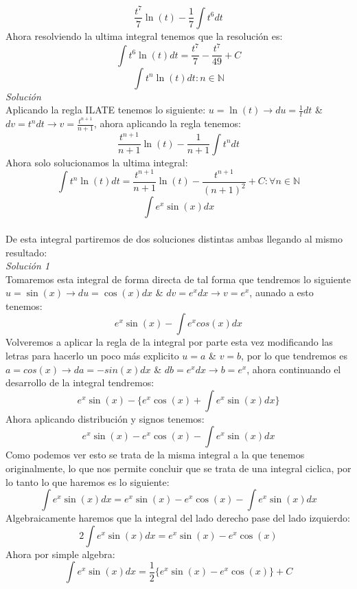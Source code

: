 \documentclass[10pt,executivepaper]{article}
\begin{document}
\[\frac{t^7}{7}\ln(t)-\frac{1}{7}\int t^{6}dt\]
Ahora resolviendo la ultima integral tenemos que la resolución es:\\
\[\int t^{6}\ln(t)dt = \frac{t^{7}}{7}-\frac{t^{7}}{49} + C\]
\vspace{1cm}
\[\int t^{n}\ln(t)dt \colon n \in \mathbb{N}\]
\textit{Solución}\\
Aplicando la regla ILATE tenemos lo siguiente: $u=\ln(t)\rightarrow du=\frac{1}{t}dt$ \& $dv=t^{n}dt \rightarrow v=\frac{t^{n+1}}{n+1}$, ahora aplicando la regla tenemos:\\
\[\frac{t^{n+1}}{n+1}\ln(t)-\frac{1}{n+1}\int t^{n}dt\]
Ahora solo solucionamos la ultima integral:
\[\int t^{n}\ln(t)dt = \frac{t^{n+1}}{n+1}\ln(t)-\frac{t^{n+1}}{(n+1)^{2}} + C \colon \forall n \in \mathbb{N}\]
\vspace{1cm}
\[\int e^{x}\sin(x)dx\]\\
De esta integral partiremos de dos soluciones distintas ambas llegando al mismo resultado:\\
\textit{Solución 1}\\
Tomaremos esta integral de forma directa de tal forma que tendremos lo siguiente $u=\sin(x)\rightarrow du= \cos(x)dx$ \& $dv=e^{x}dx \rightarrow v=e^{x}$, aunado a esto tenemos:
\[e^{x}\sin(x) - \int e^{x}cos(x)dx \]
Volveremos a aplicar la regla de la integral por parte esta vez modificando las letras para hacerlo un poco más explicito $u=a$ \& $v=b$, por lo que tendremos es $a=cos(x) \rightarrow da=-sin(x)dx$ \& $db=e^{x}dx \rightarrow b=e^{x}$, ahora continuando el desarrollo de la integral tendremos:
\[e^{x}\sin(x)-\{e^{x}\cos(x)+\int e^{x}\sin(x)dx\}\]
Ahora aplicando distribución y signos tenemos:
\[e^{x}\sin(x)-e^{x}\cos(x)-\int e^{x}\sin(x)dx\]
Como podemos ver esto se trata de la misma integral a la que tenemos originalmente, lo que nos permite concluir que se trata de una integral ciclica, por lo tanto lo que haremos es lo siguiente:
\[\int e^{x}\sin(x)dx = e^{x}\sin(x)-e^{x}\cos(x)-\int e^{x}\sin(x)dx\]
Algebraicamente haremos que la integral del lado derecho pase del lado izquierdo:
\[2\int e^{x}\sin(x)dx = e^{x}\sin(x)-e^{x}\cos(x)\]
Ahora por simple algebra:
\[\int e^{x}\sin(x)dx = \frac{1}{2}\{e^{x}\sin(x)-e^{x}\cos(x)\}+C\]
\end{document}
